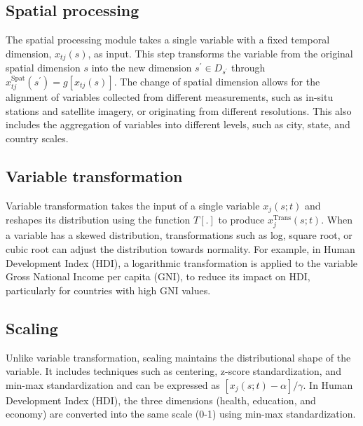 \documentclass[
]{interact}
\begin{document}
\hypertarget{spatial-processing}{%
\subsection{Spatial processing}\label{spatial-processing}}

The spatial processing module takes a single variable with a fixed
temporal dimension, \(x_{tj}(s)\), as input. This step transforms the
variable from the original spatial dimension \(s\) into the new
dimension \(s^\prime \in D_{s^\prime}\) through
\(x^{\text{Spat}}_{tj}(s^\prime) = g[x_{tj}(s)]\). The change of spatial
dimension allows for the alignment of variables collected from different
measurements, such as in-situ stations and satellite imagery, or
originating from different resolutions. This also includes the
aggregation of variables into different levels, such as city, state, and
country scales.

\hypertarget{variable-transformation}{%
\subsection{Variable transformation}\label{variable-transformation}}

Variable transformation takes the input of a single variable
\(x_j(s;t)\) and reshapes its distribution using the function \(T[.]\)
to produce \(x^{\text{Trans}}_{j}(s;t)\). When a variable has a skewed
distribution, transformations such as log, square root, or cubic root
can adjust the distribution towards normality. For example, in Human
Development Index (HDI), a logarithmic transformation is applied to the
variable Gross National Income per capita (GNI), to reduce its impact on
HDI, particularly for countries with high GNI values.

\hypertarget{scaling}{%
\subsection{Scaling}\label{scaling}}

Unlike variable transformation, scaling maintains the distributional
shape of the variable. It includes techniques such as centering, z-score
standardization, and min-max standardization and can be expressed as
\([x_{j}(s;t) - \alpha]/\gamma\). In Human Development Index (HDI), the
three dimensions (health, education, and economy) are converted into the
same scale (0-1) using min-max standardization.
\end{document}
